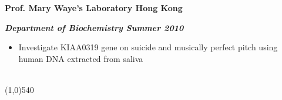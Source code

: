 \documentclass[dvips,11pt]{article}
\begin{document}
\noindent\centerline{\bf Prof. Mary Waye's Laboratory \hfill	Hong Kong}
\noindent\centerline{\textbf{\textit{Department of Biochemistry \hfill Summer 2010}}}
\vspace{-2mm}
\begin{itemize} \itemsep1pt \parskip0pt 
	\setlength{\itemsep}{0pt}
	\item Investigate KIAA0319 gene on suicide and musically perfect pitch using human DNA extracted from saliva
\end{itemize}

\bigskip
\newpage
{} \vspace{-1.5mm}
\noindent\\
\vspace{-6mm}
\line(1,0){540}\\
\end{document}
